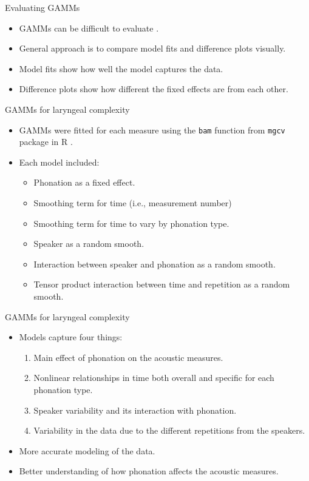 \documentclass[professionalfonts]{beamer}
\begin{document}
\begin{frame}{Evaluating GAMMs}
  \begin{itemize}
    \item GAMMs can be difficult to evaluate \citep{soskuthyGeneralisedAdditiveMixed2017,soskuthyEvaluatingGeneralisedAdditive2021}. 
    \item General approach is to compare model fits and difference plots visually.
    \item Model fits show how well the model captures the data.
    \item Difference plots show how different the fixed effects are from each other.
  \end{itemize}
\end{frame}

\begin{frame}{GAMMs for laryngeal complexity}
  \begin{itemize}
    \item GAMMs were fitted for each measure using the \texttt{bam} function from \texttt{mgcv} package in R \citep{woodGeneralizedAdditiveModels2017}.
    \item Each model included:
    \begin{itemize}
      \item Phonation as a fixed effect.
      \item Smoothing term for time (i.e., measurement number)
      \item Smoothing term for time to vary by phonation type.
      \item Speaker as a random smooth.
      \item Interaction between speaker and phonation as a random smooth.
      \item Tensor product interaction between time and repetition as a random smooth.
    \end{itemize}
  \end{itemize}
\end{frame}

\begin{frame}{GAMMs for laryngeal complexity}
  \begin{itemize}
    \item Models capture four things: 
    \begin{enumerate}
      \item Main effect of phonation on the acoustic measures.
      \item Nonlinear relationships in time both overall and specific for each phonation type.
      \item Speaker variability and its interaction with phonation.
      \item Variability in the data due to the different repetitions from the speakers.
    \end{enumerate}
    \item More accurate modeling of the data.
    \item Better understanding of how phonation affects the acoustic measures. 
  \end{itemize}  
\end{frame}
\end{document}
